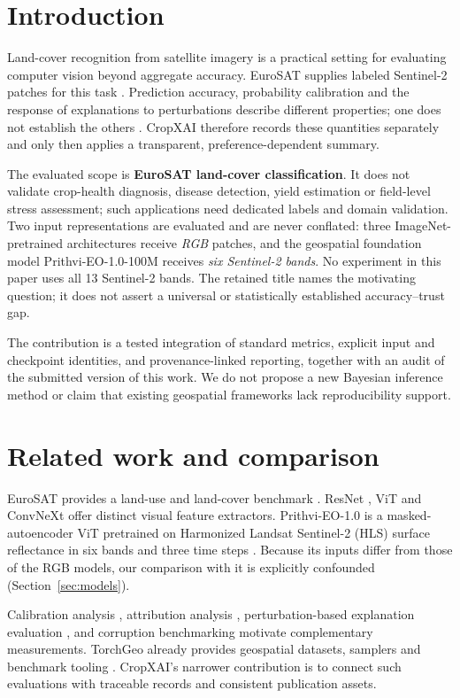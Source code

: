 \documentclass[3p,times,procedia]{elsarticle}
\begin{document}
\section{Introduction}\label{sec:introduction}
Land-cover recognition from satellite imagery is a practical setting for evaluating computer vision beyond aggregate accuracy. EuroSAT supplies labeled Sentinel-2 patches for this task \cite{eurosat}. Prediction accuracy, probability calibration and the response of explanations to perturbations describe different properties; one does not establish the others \cite{calibration,rise}. CropXAI therefore records these quantities separately and only then applies a transparent, preference-dependent summary.

The evaluated scope is \textbf{EuroSAT land-cover classification}. It does not validate crop-health diagnosis, disease detection, yield estimation or field-level stress assessment; such applications need dedicated labels and domain validation. Two input representations are evaluated and are never conflated: three ImageNet-pretrained architectures receive \emph{RGB} patches, and the geospatial foundation model Prithvi-EO-1.0-100M receives \emph{six Sentinel-2 bands}. No experiment in this paper uses all 13 Sentinel-2 bands. The retained title names the motivating question; it does not assert a universal or statistically established accuracy--trust gap.

The contribution is a tested integration of standard metrics, explicit input and checkpoint identities, and provenance-linked reporting, together with an audit of the submitted version of this work. We do not propose a new Bayesian inference method or claim that existing geospatial frameworks lack reproducibility support.

\section{Related work and comparison}\label{sec:related}
EuroSAT provides a land-use and land-cover benchmark \cite{eurosat}. ResNet \cite{resnet}, ViT \cite{vit} and ConvNeXt \cite{convnext} offer distinct visual feature extractors. Prithvi-EO-1.0 is a masked-autoencoder ViT pretrained on Harmonized Landsat Sentinel-2 (HLS) surface reflectance in six bands and three time steps \cite{prithvi,prithvicard,hls,mae}. Because its inputs differ from those of the RGB models, our comparison with it is explicitly confounded (Section~\ref{sec:models}).

Calibration analysis \cite{calibration}, attribution analysis \cite{attribution,gradcam}, perturbation-based explanation evaluation \cite{rise}, and corruption benchmarking \cite{corruptions} motivate complementary measurements. TorchGeo already provides geospatial datasets, samplers and benchmark tooling \cite{torchgeo}. CropXAI's narrower contribution is to connect such evaluations with traceable records and consistent publication assets.
\end{document}
